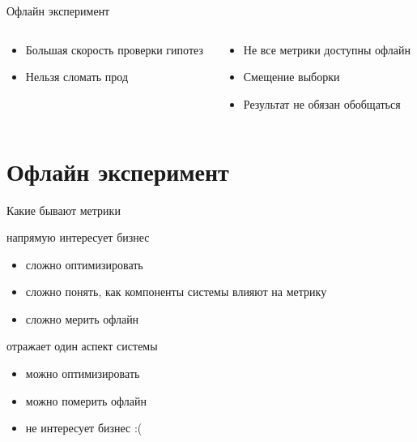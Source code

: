 \documentclass[11pt,aspectratio=169,handout]{beamer}
\begin{document}
\begin{frame}{Офлайн эксперимент}

\begin{columns}
\begin{column}{0.47\textwidth}
   \begin{tcolorbox}[colback=info!5,colframe=info!80,title=Плюсы]
      \begin{itemize}
      \item Большая скорость проверки гипотез
      \item Нельзя сломать прод
      \end{itemize}
    \end{tcolorbox}
\end{column}
\begin{column}{0.47\textwidth}
    \begin{tcolorbox}[colback=warn!5,colframe=warn!80,title=Минусы]
      \begin{itemize}
       \item Не все метрики доступны офлайн
       \item Смещение выборки
       \item Результат не обязан обобщаться
      \end{itemize}
    \end{tcolorbox}
\end{column}
\end{columns}

\end{frame}

\section{Офлайн эксперимент}

\begin{frame}{Какие бывают метрики}

\begin{tcolorbox}[colback=gray!5,colframe=gray!80,title=Бизнесовая]
напрямую интересует бизнес
\begin{itemize}
  \item сложно оптимизировать
  \item сложно понять, как компоненты системы влияют на метрику
  \item сложно мерить офлайн
 \end{itemize}
\end{tcolorbox}
\vfill
\begin{tcolorbox}[colback=gray!5,colframe=gray!80,title=Техническая]
отражает один аспект системы
\begin{itemize}
  \item можно оптимизировать
  \item можно померить офлайн
  \item не интересует бизнес :(
 \end{itemize}
\end{tcolorbox}

\end{frame}
\end{document}
